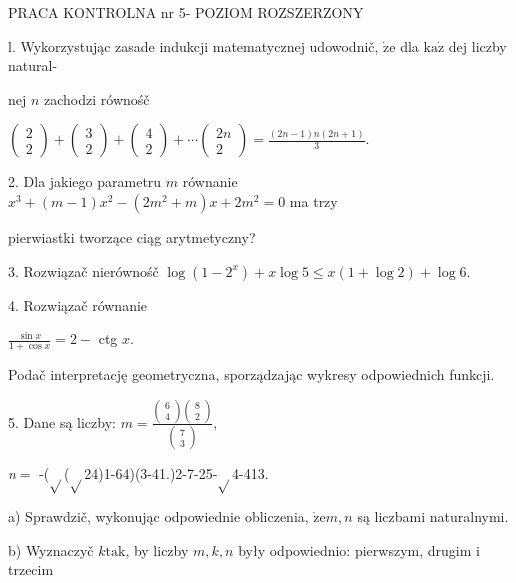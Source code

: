 \documentclass[a4paper,12pt]{article}
\begin{document}
PRACA KONTROLNA nr 5- POZIOM ROZSZERZONY

l. Wykorzystując zasade indukcji matematycznej udowodnič, $\dot{\mathrm{z}}\mathrm{e}$ dla $\mathrm{k}\mathrm{a}\dot{\mathrm{z}}$ dej liczby natural-

nej $n$ zachodzi równośč

$\left(\begin{array}{l}
2\\
2
\end{array}\right) + \left(\begin{array}{l}
3\\
2
\end{array}\right) + \left(\begin{array}{l}
4\\
2
\end{array}\right) +\cdots\left(\begin{array}{l}
2n\\
2
\end{array}\right) =\displaystyle \frac{(2n-1)n(2n+1)}{3}.$

2. Dla jakiego parametru $m$ równanie $x^{3}+(m-1)x^{2}-(2m^{2}+m)x+2m^{2}=0$ ma trzy

pierwiastki tworzące ciąg arytmetyczny?

3. Rozwiązač nierównośč $\log(1-2^{x})+x\log 5\leq x(1+\log 2)+\log 6.$

4. Rozwiązač równanie

$\displaystyle \frac{\sin x}{1+\cos x}=2-$ ctg $x.$

Podač interpretację geometryczna, sporządzając wykresy odpowiednich funkcji.

5. Dane są liczby: $m=\displaystyle \frac{\left(\begin{array}{l}
6\\
4
\end{array}\right)\left(\begin{array}{l}
8\\
2
\end{array}\right)}{\left(\begin{array}{l}
7\\
3
\end{array}\right)},$

{\it n}$=$ -($\sqrt{}$($\sqrt{}$24)1-64)(3-41.)2-7-25-$\sqrt{}$4-413.

a) Sprawdzič, wykonując odpowiednie obliczenia, $\dot{\mathrm{z}}\mathrm{e}m, n$ są liczbami naturalnymi.

b) Wyznaczyč $k\mathrm{t}\mathrm{a}\mathrm{k}$, by liczby $m, k, n$ były odpowiednio: pierwszym, drugim $\mathrm{i}$ trzecim
\end{document}

